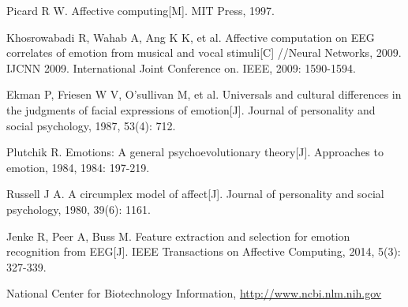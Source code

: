 \documentclass[runningheads,a4paper]{llncs}
\begin{document}
\begin{thebibliography}{4}

 Picard R W.
  Affective computing[M].
   MIT Press, 1997.

 Khosrowabadi R, Wahab A, Ang K K, et al.
Affective computation on EEG correlates of emotion from musical and vocal stimuli[C]
//Neural Networks, 2009. IJCNN 2009. International Joint Conference on. IEEE, 2009: 1590-1594.

 Ekman P, Friesen W V, O'sullivan M, et al.
Universals and cultural differences in the judgments of facial expressions of emotion[J].
Journal of personality and social psychology, 1987, 53(4): 712.

 Plutchik R.
Emotions: A general psychoevolutionary theory[J].
Approaches to emotion, 1984, 1984: 197-219.

 Russell J A.
A circumplex model of affect[J].
Journal of personality and social psychology, 1980, 39(6): 1161.

 Jenke R, Peer A, Buss M.
Feature extraction and selection for emotion recognition from EEG[J].
IEEE Transactions on Affective Computing, 2014, 5(3): 327-339.

 National Center for Biotechnology Information, \url{http://www.ncbi.nlm.nih.gov}

\end{thebibliography}
\end{document}
